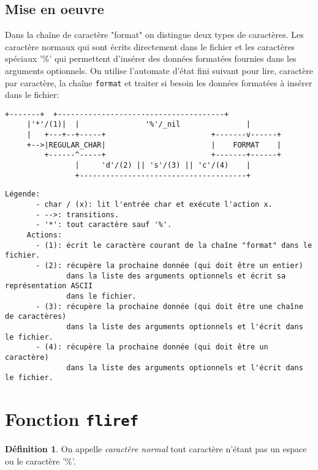 \documentclass[11pt]{article}
\theoremstyle{definition}
\newtheorem*{mydef}{Définition}
\theoremstyle{definition}
\begin{document}
\subsection{Mise en oeuvre}
Dans la chaîne de caractère "format" on distingue deux types de caractères.
Les caractère normaux qui sont écrits directement dans le fichier et les
caractères spéciaux '\%' qui permettent d'insérer des données formatées
fournies dans les arguments optionnels. On utilise l'automate d'état fini
suivant pour lire, caractère par caractère, la chaîne \texttt{format} et traiter
si besoin les données formatées à insérer dans le fichier:
\begin{lstlisting}[columns=fixed,basicstyle=\scriptsize\ttfamily]
     +-------+  +--------------------------------------+
     |'*'/(1)|  |               '%'/_nil               |
     |   +---+--+-----+                        +-------v------+
     +-->|REGULAR_CHAR|                        |    FORMAT    |
         +------^-----+                        +-------+------+
                |     'd'/(2) || 's'/(3) || 'c'/(4)    |
                +--------------------------------------+
\end{lstlisting}

\begin{lstlisting}[columns=fixed,basicstyle=\scriptsize\ttfamily]
     Légende:
       - char / (x): lit l'entrée char et exécute l'action x.
       - -->: transitions.
       - '*': tout caractère sauf '%'.
     Actions:
       - (1): écrit le caractère courant de la chaîne "format" dans le fichier.
       - (2): récupère la prochaine donnée (qui doit être un entier)
              dans la liste des arguments optionnels et écrit sa représentation ASCII
              dans le fichier.
       - (3): récupère la prochaine donnée (qui doit être une chaîne de caractères)
              dans la liste des arguments optionnels et l'écrit dans le fichier.
       - (4): récupère la prochaine donnée (qui doit être un caractère)
              dans la liste des arguments optionnels et l'écrit dans le fichier.
\end{lstlisting}






\section{Fonction \texttt{fliref}}
\begin{mydef} On appelle \textit{caractère normal} tout caractère n'étant pas un espace ou le caractère '\%'.
\end{mydef}
\end{document}
